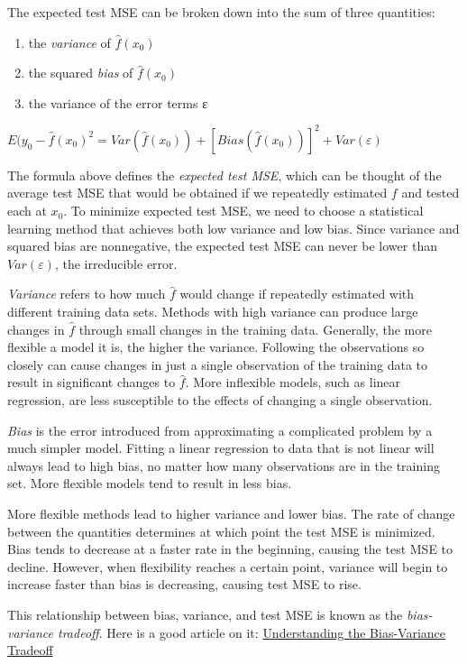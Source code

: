 \documentclass[]{book}
\providecommand{\tightlist}{%
  \setlength{\itemsep}{0pt}\setlength{\parskip}{0pt}}
\theoremstyle{definition}
\theoremstyle{definition}
\theoremstyle{definition}
\theoremstyle{remark}
\begin{document}
The expected test MSE can be broken down into the sum of three
quantities:

\begin{enumerate}
\def\labelenumi{\arabic{enumi}.}
\tightlist
\item
  the \emph{variance} of \(\hat{f}(x_0)\)
\item
  the squared \emph{bias} of \(\hat{f}(x_0)\)
\item
  the variance of the error terms ε
\end{enumerate}

\(E(y_0 - \hat{f}(x_0)^2 = Var(\hat{f}(x_0)) + [Bias(\hat{f}(x_0))]^2+Var(ε)\)

The formula above defines the \emph{expected test MSE}, which can be
thought of the average test MSE that would be obtained if we repeatedly
estimated \(f\) and tested each at \(x_0\). To minimize expected test
MSE, we need to choose a statistical learning method that achieves both
low variance and low bias. Since variance and squared bias are
nonnegative, the expected test MSE can never be lower than \(Var(ε)\),
the irreducible error.

\emph{Variance} refers to how much \(\hat{f}\) would change if
repeatedly estimated with different training data sets. Methods with
high variance can produce large changes in \(\hat{f}\) through small
changes in the training data. Generally, the more flexible a model it
is, the higher the variance. Following the observations so closely can
cause changes in just a single observation of the training data to
result in significant changes to \(\hat{f}\). More inflexible models,
such as linear regression, are less susceptible to the effects of
changing a single observation.

\emph{Bias} is the error introduced from approximating a complicated
problem by a much simpler model. Fitting a linear regression to data
that is not linear will always lead to high bias, no matter how many
observations are in the training set. More flexible models tend to
result in less bias.

More flexible methods lead to higher variance and lower bias. The rate
of change between the quantities determines at which point the test MSE
is minimized. Bias tends to decrease at a faster rate in the beginning,
causing the test MSE to decline. However, when flexibility reaches a
certain point, variance will begin to increase faster than bias is
decreasing, causing test MSE to rise.

This relationship between bias, variance, and test MSE is known as the
\emph{bias-variance tradeoff}. Here is a good article on it:
\href{http://scott.fortmann-roe.com/docs/BiasVariance.html}{Understanding
the Bias-Variance Tradeoff}
\end{document}
